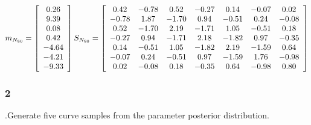 \documentclass{article}
\begin{document}
\[
m_{N_{80}}= \left[\begin{array}{*{1}c}
0.26 \\
9.39 \\
0.08 \\
0.42 \\
-4.64 \\
-4.21 \\
-9.33 \\
\end{array}\right]
S_{N_{80}}= \left[\begin{array}{*{7}c}
0.42 & -0.78 & 0.52 & -0.27 & 0.14 & -0.07 & 0.02 \\
-0.78 & 1.87 & -1.70 & 0.94 & -0.51 & 0.24 & -0.08 \\
0.52 & -1.70 & 2.19 & -1.71 & 1.05 & -0.51 & 0.18 \\
-0.27 & 0.94 & -1.71 & 2.18 & -1.82 & 0.97 & -0.35 \\
0.14 & -0.51 & 1.05 & -1.82 & 2.19 & -1.59 & 0.64 \\
-0.07 & 0.24 & -0.51 & 0.97 & -1.59 & 1.76 & -0.98 \\
0.02 & -0.08 & 0.18 & -0.35 & 0.64 & -0.98 & 0.80 \\
\end{array}\right]
\]

\subsubsection*{2}.Generate five curve samples from the parameter posterior distribution.
\end{document}
